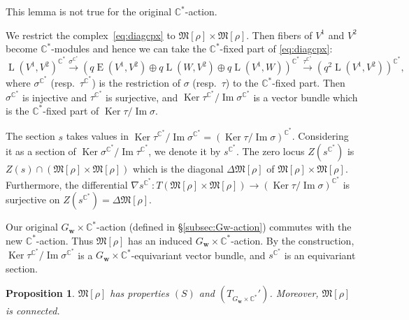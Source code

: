 \documentclass[12pt]{amsart}
\def\Bbb{\mathbb}
\def\frak{\mathfrak}
\newtheorem{Proposition}[equation]{Proposition}
\theoremstyle{definition}
\theoremstyle{remark}
\numberwithin{equation}{subsection}
\newcommand{\subsecref}[1]{\S\ref{#1}}
\newcommand{\C}{{\Bbb C}}
\newcommand{\Ker}{\operatorname{Ker}}
\newcommand{\Ima}{\operatorname{Im}}
\newcommand{\M}{{\frak M}} %
\newcommand{\bw}{{\mathbf w}} %
\newcommand{\HomE}{\operatorname{E}}
\newcommand{\HomL}{\operatorname{L}}
\begin{document}
This lemma is not true for the original $\C^*$-action.

We restrict the complex~\eqref{eq:diagcpx} to
$\M[\rho]\times\M[\rho]$. Then fibers of $V^1$ and $V^2$ become
$\C^*$-modules and hence we can take the $\C^*$-fixed part of
\eqref{eq:diagcpx}:
\begin{equation*}
  \HomL(V^1, V^2)^{\C^*}
  \overset{\sigma^{\C^*}}{\longrightarrow}
  \left(
    q \HomE(V^1,V^2) \oplus q \HomL(W, V^2) \oplus q \HomL(V^1,W)
  \right)^{\C^*}
  \overset{\tau^{\C^*}}{\longrightarrow}
    (q^2 \HomL(V^1, V^2))^{\C^*},
\end{equation*}
where $\sigma^{\C^*}$ (resp.\ $\tau^{\C^*}$) is the restriction of
$\sigma$ (resp.\ $\tau$) to the ${\C^*}$-fixed part. Then $\sigma^{\C^*}$ 
is injective and $\tau^{\C^*}$ is surjective, and
$\Ker\tau^{\C^*}/\Ima\sigma^{\C^*}$ is a vector bundle which is
the ${\C^*}$-fixed part of $\Ker\tau/\Ima\sigma$.

The section $s$ takes values in
$\Ker\tau^{\C^*}/\Ima\sigma^{\C^*} =
(\Ker\tau/\Ima\sigma)^{\C^*}$. Considering it as a section of
$\Ker\sigma^{\C^*}/\Ima\tau^{\C^*}$, we denote it by $s^{\C^*}$. The
zero locus $Z(s^{\C^*})$ is $Z(s)\cap(\M[\rho]\times\M[\rho])$ which
is the diagonal $\Delta\M[\rho]$ of
$\M[\rho]\times\M[\rho]$. Furthermore, the differential 
$\nabla s^{\C^*}\colon T(\M[\rho]\times\M[\rho])\to
(\Ker\tau/\Ima\sigma)^{\C^*}$ is surjective on $Z(s^{\C^*})=\Delta\M[\rho]$.

Our original $G_\bw\times \C^*$-action (defined in
\subsecref{subsec:Gw-action}) commutes with the new
$\C^*$-action. Thus $\M[\rho]$ has an induced $G_\bw\times
\C^*$-action. By the construction, $\Ker\tau^{\C^*}/\Ima\sigma^{\C^*}$ 
is a $G_\bw\times \C^*$-equivariant vector bundle, and $s^{\C^*}$ is
an equivariant section.

\begin{Proposition}\label{prop:fix_conn}
$\M[\rho]$ has properties $(S)$ and $(T_{G_\bw\times \C^*}')$.
Moreover, $\M[\rho]$ is connected.
\end{Proposition}
\end{document}
